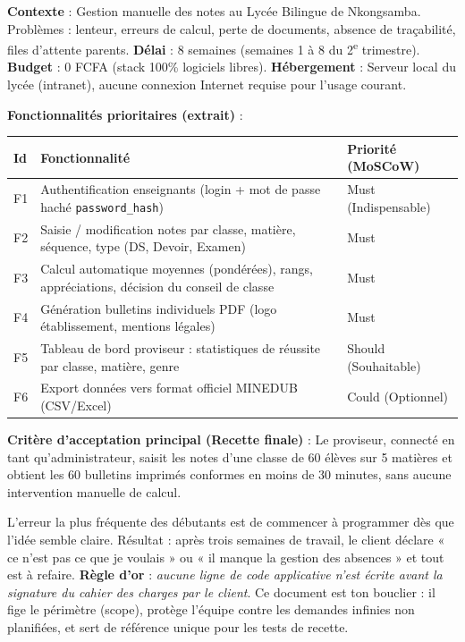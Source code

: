 \documentclass[11pt]{article}
\begin{document}
\begin{exemplebox}
\textbf{Contexte} : Gestion manuelle des notes au Lycée Bilingue de Nkongsamba. Problèmes : lenteur, erreurs de calcul, perte de documents, absence de traçabilité, files d'attente parents.
\textbf{Délai} : 8 semaines (semaines 1 à 8 du 2\textsuperscript{e} trimestre). \textbf{Budget} : 0 FCFA (stack 100\% logiciels libres). \textbf{Hébergement} : Serveur local du lycée (intranet), aucune connexion Internet requise pour l'usage courant.

\textbf{Fonctionnalités prioritaires (extrait)} :
\begin{center}
\begin{tabularx}{\linewidth}{|l|X|l|}
\hline
\rowcolor{popblueL} \textbf{Id} & \textbf{Fonctionnalité} & \textbf{Priorité (MoSCoW)} \\
\hline
F1 & Authentification enseignants (login + mot de passe haché \texttt{password\_hash}) & Must (Indispensable) \\
\hline
F2 & Saisie / modification notes par classe, matière, séquence, type (DS, Devoir, Examen) & Must \\
\hline
F3 & Calcul automatique moyennes (pondérées), rangs, appréciations, décision du conseil de classe & Must \\
\hline
F4 & Génération bulletins individuels PDF (logo établissement, mentions légales) & Must \\
\hline
F5 & Tableau de bord proviseur : statistiques de réussite par classe, matière, genre & Should (Souhaitable) \\
\hline
F6 & Export données vers format officiel MINEDUB (CSV/Excel) & Could (Optionnel) \\
\hline
\end{tabularx}
\end{center}

\textbf{Critère d'acceptation principal (Recette finale)} : Le proviseur, connecté en tant qu'administrateur, saisit les notes d'une classe de 60 élèves sur 5 matières et obtient les 60 bulletins imprimés conformes en moins de 30 minutes, sans aucune intervention manuelle de calcul.
\end{exemplebox}

\begin{attention}
L'erreur la plus fréquente des débutants est de commencer à programmer dès que l'idée semble claire. Résultat : après trois semaines de travail, le client déclare « ce n'est pas ce que je voulais » ou « il manque la gestion des absences » et tout est à refaire. \textbf{Règle d'or} : \emph{aucune ligne de code applicative n'est écrite avant la signature du cahier des charges par le client}. Ce document est ton bouclier : il fige le périmètre (scope), protège l'équipe contre les demandes infinies non planifiées, et sert de référence unique pour les tests de recette.
\end{attention}
\end{document}
